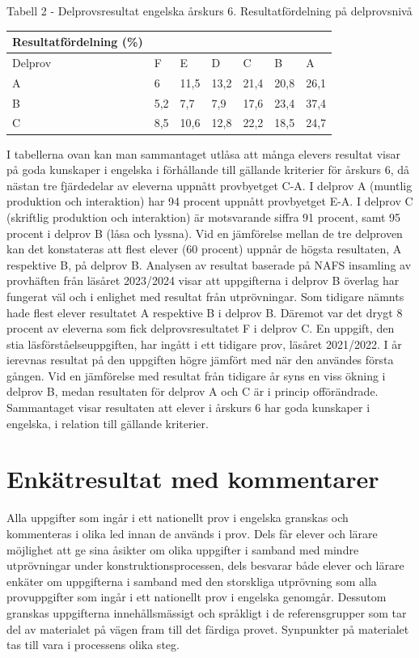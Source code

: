 Tabell 2 - Delprovsresultat engelska årskurs 6. Resultatfördelning på delprovsnivå
\begin{tabular}{|l|l|l|l|l|l|l|}
\hline Resultatfördelning (\%) & & & & & & \\
\hline Delprov & F & E & D & C & B & A \\
\hline A & 6 & 11,5 & 13,2 & 21,4 & 20,8 & 26,1 \\
\hline B & 5,2 & 7,7 & 7,9 & 17,6 & 23,4 & 37,4 \\
\hline C & 8,5 & 10,6 & 12,8 & 22,2 & 18,5 & 24,7 \\
\hline
\end{tabular}
I tabellerna ovan kan man sammantaget utlåsa att många elevers resultat visar på goda kunskaper i engelska i förhållande till gällande kriterier för årskurs 6, då nästan tre fjärdedelar av eleverna uppnått provbyetget C-A. I delprov A (muntlig produktion och interaktion) har 94 procent uppnått provbyetget E-A. I delprov C (skriftlig produktion och interaktion) är motsvarande siffra 91 procent, samt 95 procent i delprov B (låsa och lyssna). Vid en jämförelse mellan de tre delproven kan det konstateras att flest elever (60 procent) uppnår de högsta resultaten, A respektive B, på delprov B.
Analysen av resultat baserade på NAFS insamling av provhäften från läsåret 2023/2024 visar att uppgifterna i delprov B överlag har fungerat väl och i enlighet med resultat från utprövningar. Som tidigare nämnts hade flest elever resultatet A respektive B i delprov B. Däremot var det drygt 8 procent av eleverna som fick delprovsresultatet F i delprov C.
En uppgift, den stia läsförståelseuppgiften, har ingått i ett tidigare prov, läsåret 2021/2022. I år ierevnas resultat på den uppgiften högre jämfört med när den användes första gången. Vid en jämförelse med resultat från tidigare år syns en viss ökning i delprov B, medan resultaten för delprov A och C är i princip offörändrade. Sammantaget visar resultaten att elever i årskurs 6 har goda kunskaper i engelska, i relation till gällande kriterier.
\section*{Enkätresultat med kommentarer}
Alla uppgifter som ingår i ett nationellt prov i engelska granskas och kommenteras i olika led innan de används i prov. Dels får elever och lärare möjlighet att ge sina åsikter om olika uppgifter i samband med mindre utprövningar under konstruktionsprocessen, dels besvarar både elever och lärare enkäter om uppgifterna i samband med den storskliga utprövning som alla provuppgifter som ingår i ett nationellt prov i engelska genomgår. Dessutom granskas uppgifterna innehållsmässigt och språkligt i de referensgrupper som tar del av materialet på vägen fram till det färdiga provet. Synpunkter på materialet tas till vara i processens olika steg.
